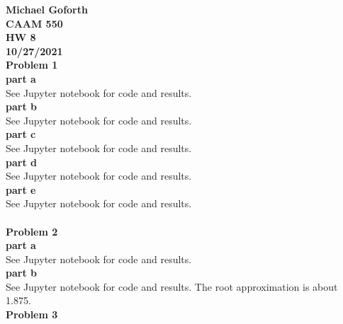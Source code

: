 \documentclass{article} %
\begin{document}
\textbf{Michael Goforth} \\
\textbf{CAAM 550} \\
\textbf{HW 8} \\
\textbf{10/27/2021} \\ 

\textbf{Problem 1} \\

\textbf{part a} \\
See Jupyter notebook for code and results.
\\

\textbf{part b} \\
See Jupyter notebook for code and results.
\\

\textbf{part c} \\
See Jupyter notebook for code and results.
\\

\textbf{part d} \\
See Jupyter notebook for code and results.
\\

\textbf{part e} \\
See Jupyter notebook for code and results.
\\
\\


\textbf{Problem 2} \\

\textbf{part a} \\
See Jupyter notebook for code and results.
\\

\textbf{part b} \\
See Jupyter notebook for code and results.  The root approximation is about 1.875.
\\


\textbf{Problem 3} \\
\end{document}
